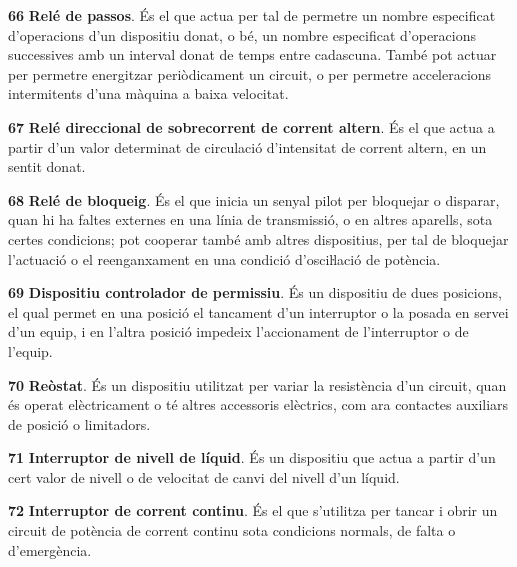 \begin{multicols}{2}
\begin{list}{}
\item[\textbf{66}]   
\textbf{Relé de passos}. És el que actua per tal
de permetre un nombre especificat d'operacions d'un dispositiu
donat, o bé, un nombre especificat d'operacions successives amb un
interval donat de temps entre cadascuna. També pot actuar per
permetre energitzar periòdicament un circuit, o per permetre acceleracions intermitents d'una
màquina a baixa velocitat.

\item[\textbf{67}]  
\textbf{Relé direccional de sobrecorrent de corrent altern}. És
el que actua a partir d'un valor determinat de circulació
d'intensitat de corrent altern, en un sentit donat.

\item[\textbf{68}]   
\textbf{Relé de bloqueig}. És el que inicia un senyal pilot per bloquejar o disparar, quan hi ha faltes externes en
una línia de transmissió, o en altres aparells, sota certes
condicions; pot cooperar també amb altres dispositius, per tal de
bloquejar l'actuació o el reenganxament en una condició
 d'osciŀlació de potència.

\item[\textbf{69}]   
\textbf{Dispositiu controlador de permissiu}. És
un dispositiu  de dues posicions, el qual permet en una posició el tancament d'un
interruptor o la posada en servei d'un equip, i en l'altra posició
impedeix l'accionament de l'interruptor o de l'equip.

\item[\textbf{70}]   
\textbf{Reòstat}. És un dispositiu utilitzat per
variar la resistència d'un circuit, quan és operat elèctricament o té altres accessoris elèctrics, com ara contactes auxiliars de posició o limitadors.

\item[\textbf{71}]   
\textbf{Interruptor de nivell de líquid}. És un dispositiu que actua a partir d'un cert valor de nivell o de velocitat de canvi del nivell d'un líquid.

\item[\textbf{72}]   
\textbf{Interruptor de corrent continu}. És el que s'utilitza per tancar i obrir un circuit de potència de corrent continu
 sota condicions normals, de falta o d'emergència.


\end{list}
\end{multicols}
